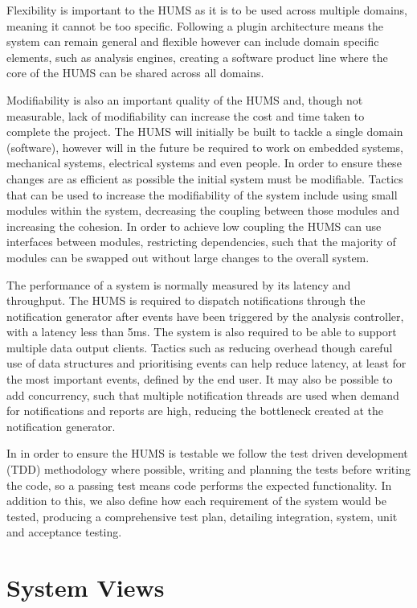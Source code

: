 \documentclass[10pt,a4paper]{article}
\begin{document}
Flexibility is important to the HUMS as it is to be used across multiple 
domains, meaning it cannot be too specific. Following a plugin 
architecture means the system can remain general and flexible however 
can include domain specific elements, such as analysis engines, 
creating a software product line where the core of the HUMS can be 
shared across all domains.

Modifiability is also an important quality of the HUMS and, though not 
measurable, lack of modifiability can increase the cost and time taken to 
complete the project. The HUMS will initially be built to tackle a single 
domain (software), however will in the future be required to work on embedded 
systems, mechanical systems, electrical systems and even people. In 
order to ensure these changes are as efficient as possible the initial system 
must be modifiable. Tactics that can be used to increase the modifiability 
of the system include using small modules within the system, decreasing the 
coupling between those modules and increasing the cohesion. In order 
to achieve low coupling the HUMS can use interfaces between modules, restricting dependencies, such that the majority of modules can be 
swapped out without large changes to the overall system.

The performance of a system is normally measured by its latency and 
throughput. The HUMS is required to dispatch notifications through the 
notification generator after events have been triggered by the analysis 
controller, with a latency less than 5ms. The system is also required to be
able to support multiple data output clients. Tactics such as reducing
overhead though careful use of data structures and prioritising events can
help reduce latency, at least for the most important events, defined by the
end user. It may also be possible to add concurrency, such that multiple
notification threads are used when demand for notifications and reports are
high, reducing the bottleneck created at the notification generator.

In in order to ensure the HUMS is testable we follow the test driven 
development (TDD) methodology where possible, writing and planning the tests 
before writing the code, so a passing test means code performs the 
expected functionality. In addition to this, we also define how 
each requirement of the system would be tested, producing a 
comprehensive test plan, detailing integration, system, unit and 
acceptance testing.

\section{System Views}
\label{sec:architecture-views}
\end{document}
